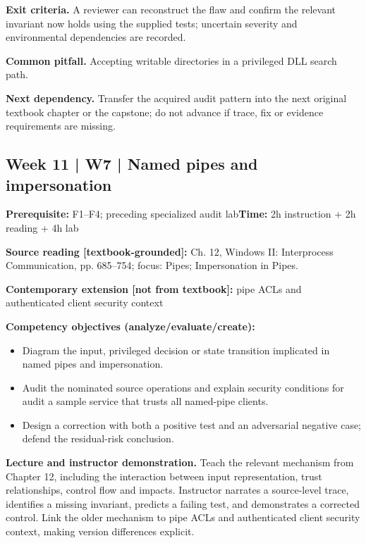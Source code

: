 \documentclass[10pt,letterpaper]{article}
\begin{document}
\textbf{Exit criteria.} A reviewer can reconstruct the flaw and confirm the relevant invariant now holds using the supplied tests; uncertain severity and environmental dependencies are recorded.

\textbf{Common pitfall.} Accepting writable directories in a privileged DLL search path.

\textbf{Next dependency.} Transfer the acquired audit pattern into the next original textbook chapter or the capstone; do not advance if trace, fix or evidence requirements are missing.

\subsection{Week 11 | W7 | Named pipes and impersonation}
\textbf{Prerequisite:} F1--F4; preceding specialized audit lab\hfill\textbf{Time:} 2h instruction + 2h reading + 4h lab

\textbf{Source reading [textbook-grounded]:} Ch. 12, Windows II: Interprocess Communication, pp. 685--754; focus: Pipes; Impersonation in Pipes.

\textbf{Contemporary extension [not from textbook]:} pipe ACLs and authenticated client security context

\textbf{Competency objectives (analyze/evaluate/create):}
\begin{itemize}[leftmargin=*,itemsep=2pt]
\item Diagram the input, privileged decision or state transition implicated in named pipes and impersonation.
\item Audit the nominated source operations and explain security conditions for audit a sample service that trusts all named-pipe clients.
\item Design a correction with both a positive test and an adversarial negative case; defend the residual-risk conclusion.
\end{itemize}
\textbf{Lecture and instructor demonstration.} Teach the relevant mechanism from Chapter 12, including the interaction between input representation, trust relationships, control flow and impacts. Instructor narrates a source-level trace, identifies a missing invariant, predicts a failing test, and demonstrates a corrected control. Link the older mechanism to pipe ACLs and authenticated client security context, making version differences explicit.
\end{document}
